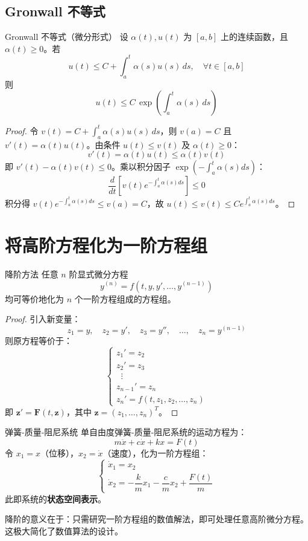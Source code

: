 \subsection{Gronwall 不等式}

\begin{theorem}{Gronwall 不等式（微分形式）}
	设 $\alpha(t), u(t)$ 为 $[a,b]$ 上的连续函数，且 $\alpha(t) \ge 0$。若
	\[
	u(t) \le C + \int_{a}^{t} \alpha(s) u(s) \, ds, \quad \forall t \in [a,b]
	\]
	则
	\[
	u(t) \le C \, \exp\left(\int_{a}^{t} \alpha(s) \, ds\right)
	\]
\end{theorem}

\begin{proof}
	令 $v(t) = C + \int_{a}^{t} \alpha(s) u(s) \, ds$，则 $v(a) = C$ 且 $v'(t) = \alpha(t) u(t)$。由条件 $u(t) \le v(t)$ 及 $\alpha(t) \ge 0$：
	\[
	v'(t) = \alpha(t) u(t) \le \alpha(t) v(t)
	\]
	即 $v'(t) - \alpha(t) v(t) \le 0$。乘以积分因子 $\exp(-\int_{a}^{t} \alpha(s) ds)$：
	\[
	\frac{d}{dt}\left[ v(t) e^{-\int_{a}^{t} \alpha(s) ds} \right] \le 0
	\]
	积分得 $v(t) e^{-\int_{a}^{t} \alpha(s) ds} \le v(a) = C$，故 $u(t) \le v(t) \le C e^{\int_{a}^{t} \alpha(s) ds}$。
\end{proof}

\section{将高阶方程化为一阶方程组}

\begin{proposition}{降阶方法}
	任意 $n$ 阶显式微分方程
	\[
	y^{(n)} = f(t, y, y', \ldots, y^{(n-1)})
	\]
	均可等价地化为 $n$ 个一阶方程组成的方程组。
\end{proposition}

\begin{proof}
	引入新变量：
	\[
	z_1 = y, \quad z_2 = y', \quad z_3 = y'', \quad \ldots, \quad z_n = y^{(n-1)}
	\]
	则原方程等价于：
	\[
	\begin{cases}
		z_1' = z_2 \\
		z_2' = z_3 \\
		\;\; \vdots \\
		z_{n-1}' = z_n \\
		z_n' = f(t, z_1, z_2, \ldots, z_n)
	\end{cases}
	\]
	即 $\mathbf{z}' = \mathbf{F}(t, \mathbf{z})$，其中 $\mathbf{z} = (z_1, \ldots, z_n)^T$。
\end{proof}

\begin{example}{弹簧-质量-阻尼系统}
	单自由度弹簧-质量-阻尼系统的运动方程为：
	\[
	m \ddot{x} + c \dot{x} + k x = F(t)
	\]
	令 $x_1 = x$（位移），$x_2 = \dot{x}$（速度），化为一阶方程组：
	\[
	\begin{cases}
		\dot{x}_1 = x_2 \\[4pt]
		\dot{x}_2 = -\dfrac{k}{m} x_1 - \dfrac{c}{m} x_2 + \dfrac{F(t)}{m}
	\end{cases}
	\]
	此即系统的\textbf{状态空间表示}。
\end{example}

\begin{remark}
	降阶的意义在于：只需研究一阶方程组的数值解法，即可处理任意高阶微分方程。这极大简化了数值算法的设计。
\end{remark}
